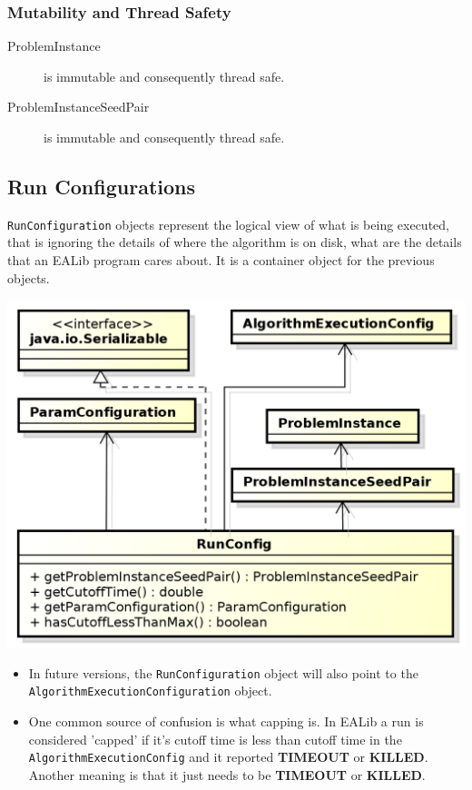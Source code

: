 \documentclass[11pt,letterpaper,oneside]{article}
\begin{document}
\subsubsection{Mutability and Thread Safety}
\begin{description}
\item[ProblemInstance] is immutable and consequently thread safe.
\item[ProblemInstanceSeedPair] is immutable and consequently thread safe.
\end{description}


\subsection{Run Configurations}

\texttt{RunConfiguration} objects represent the logical view of what is being executed, that is ignoring the details of where the algorithm is on disk, what are the details that an EALib program cares about. It is a container object for the previous objects.

\begin{center}
\includegraphics[scale=0.75]{img/UML/RunConfig_2.png}
\end{center}

\begin{itemize}
\item In future versions, the \texttt{RunConfiguration} object will also point to the \texttt{AlgorithmExecutionConfiguration} object.
\item One common source of confusion is what capping is. In EALib a run is considered 'capped' if it's cutoff time is less than cutoff time in the \texttt{AlgorithmExecutionConfig} and it reported \textbf{TIMEOUT} or \textbf{KILLED}. Another meaning is that it just needs to be \textbf{TIMEOUT} or \textbf{KILLED}.
\end{itemize}
\end{document}
